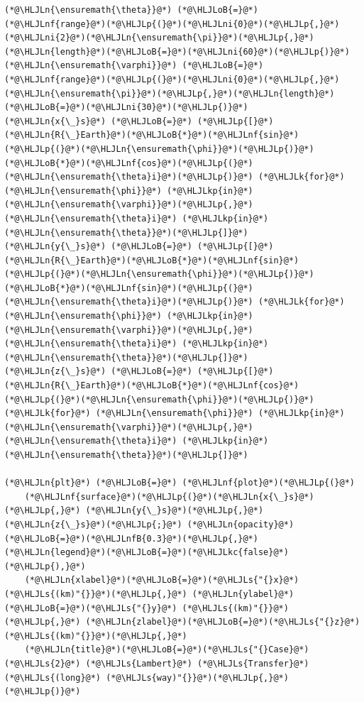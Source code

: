 \documentclass[12pt,a4paper]{article}
\newcommand{\HLJLk}[1]{\textcolor[RGB]{148,91,176}{\textbf{#1}}}
\newcommand{\HLJLkc}[1]{\textcolor[RGB]{59,151,46}{\textit{#1}}}
\newcommand{\HLJLkp}[1]{\textcolor[RGB]{148,91,176}{\textbf{#1}}}
\newcommand{\HLJLn}[1]{#1}
\newcommand{\HLJLnf}[1]{\textcolor[RGB]{66,102,213}{#1}}
\newcommand{\HLJLs}[1]{\textcolor[RGB]{201,61,57}{#1}}
\newcommand{\HLJLnfB}[1]{\textcolor[RGB]{59,151,46}{#1}}
\newcommand{\HLJLni}[1]{\textcolor[RGB]{59,151,46}{#1}}
\newcommand{\HLJLoB}[1]{\textcolor[RGB]{102,102,102}{\textbf{#1}}}
\newcommand{\HLJLp}[1]{#1}
\begin{document}
\begin{lstlisting}
(*@\HLJLn{\ensuremath{\theta}}@*) (*@\HLJLoB{=}@*) (*@\HLJLnf{range}@*)(*@\HLJLp{(}@*)(*@\HLJLni{0}@*)(*@\HLJLp{,}@*)(*@\HLJLni{2}@*)(*@\HLJLn{\ensuremath{\pi}}@*)(*@\HLJLp{,}@*)(*@\HLJLn{length}@*)(*@\HLJLoB{=}@*)(*@\HLJLni{60}@*)(*@\HLJLp{)}@*)
(*@\HLJLn{\ensuremath{\varphi}}@*) (*@\HLJLoB{=}@*) (*@\HLJLnf{range}@*)(*@\HLJLp{(}@*)(*@\HLJLni{0}@*)(*@\HLJLp{,}@*)(*@\HLJLn{\ensuremath{\pi}}@*)(*@\HLJLp{,}@*)(*@\HLJLn{length}@*)(*@\HLJLoB{=}@*)(*@\HLJLni{30}@*)(*@\HLJLp{)}@*)
(*@\HLJLn{x{\_}s}@*) (*@\HLJLoB{=}@*) (*@\HLJLp{[}@*)(*@\HLJLn{R{\_}Earth}@*)(*@\HLJLoB{*}@*)(*@\HLJLnf{sin}@*)(*@\HLJLp{(}@*)(*@\HLJLn{\ensuremath{\phi}}@*)(*@\HLJLp{)}@*)(*@\HLJLoB{*}@*)(*@\HLJLnf{cos}@*)(*@\HLJLp{(}@*)(*@\HLJLn{\ensuremath{\theta}i}@*)(*@\HLJLp{)}@*) (*@\HLJLk{for}@*) (*@\HLJLn{\ensuremath{\phi}}@*) (*@\HLJLkp{in}@*) (*@\HLJLn{\ensuremath{\varphi}}@*)(*@\HLJLp{,}@*) (*@\HLJLn{\ensuremath{\theta}i}@*) (*@\HLJLkp{in}@*) (*@\HLJLn{\ensuremath{\theta}}@*)(*@\HLJLp{]}@*)
(*@\HLJLn{y{\_}s}@*) (*@\HLJLoB{=}@*) (*@\HLJLp{[}@*)(*@\HLJLn{R{\_}Earth}@*)(*@\HLJLoB{*}@*)(*@\HLJLnf{sin}@*)(*@\HLJLp{(}@*)(*@\HLJLn{\ensuremath{\phi}}@*)(*@\HLJLp{)}@*)(*@\HLJLoB{*}@*)(*@\HLJLnf{sin}@*)(*@\HLJLp{(}@*)(*@\HLJLn{\ensuremath{\theta}i}@*)(*@\HLJLp{)}@*) (*@\HLJLk{for}@*) (*@\HLJLn{\ensuremath{\phi}}@*) (*@\HLJLkp{in}@*) (*@\HLJLn{\ensuremath{\varphi}}@*)(*@\HLJLp{,}@*) (*@\HLJLn{\ensuremath{\theta}i}@*) (*@\HLJLkp{in}@*) (*@\HLJLn{\ensuremath{\theta}}@*)(*@\HLJLp{]}@*)
(*@\HLJLn{z{\_}s}@*) (*@\HLJLoB{=}@*) (*@\HLJLp{[}@*)(*@\HLJLn{R{\_}Earth}@*)(*@\HLJLoB{*}@*)(*@\HLJLnf{cos}@*)(*@\HLJLp{(}@*)(*@\HLJLn{\ensuremath{\phi}}@*)(*@\HLJLp{)}@*)          (*@\HLJLk{for}@*) (*@\HLJLn{\ensuremath{\phi}}@*) (*@\HLJLkp{in}@*) (*@\HLJLn{\ensuremath{\varphi}}@*)(*@\HLJLp{,}@*) (*@\HLJLn{\ensuremath{\theta}i}@*) (*@\HLJLkp{in}@*) (*@\HLJLn{\ensuremath{\theta}}@*)(*@\HLJLp{]}@*)

(*@\HLJLn{plt}@*) (*@\HLJLoB{=}@*) (*@\HLJLnf{plot}@*)(*@\HLJLp{(}@*)
    (*@\HLJLnf{surface}@*)(*@\HLJLp{(}@*)(*@\HLJLn{x{\_}s}@*)(*@\HLJLp{,}@*) (*@\HLJLn{y{\_}s}@*)(*@\HLJLp{,}@*) (*@\HLJLn{z{\_}s}@*)(*@\HLJLp{;}@*) (*@\HLJLn{opacity}@*)(*@\HLJLoB{=}@*)(*@\HLJLnfB{0.3}@*)(*@\HLJLp{,}@*) (*@\HLJLn{legend}@*)(*@\HLJLoB{=}@*)(*@\HLJLkc{false}@*)(*@\HLJLp{),}@*)
    (*@\HLJLn{xlabel}@*)(*@\HLJLoB{=}@*)(*@\HLJLs{"{}x}@*) (*@\HLJLs{(km)"{}}@*)(*@\HLJLp{,}@*) (*@\HLJLn{ylabel}@*)(*@\HLJLoB{=}@*)(*@\HLJLs{"{}y}@*) (*@\HLJLs{(km)"{}}@*)(*@\HLJLp{,}@*) (*@\HLJLn{zlabel}@*)(*@\HLJLoB{=}@*)(*@\HLJLs{"{}z}@*) (*@\HLJLs{(km)"{}}@*)(*@\HLJLp{,}@*)
    (*@\HLJLn{title}@*)(*@\HLJLoB{=}@*)(*@\HLJLs{"{}Case}@*) (*@\HLJLs{2}@*) (*@\HLJLs{Lambert}@*) (*@\HLJLs{Transfer}@*) (*@\HLJLs{(long}@*) (*@\HLJLs{way)"{}}@*)(*@\HLJLp{,}@*)
(*@\HLJLp{)}@*)


\end{lstlisting}
\end{document}
